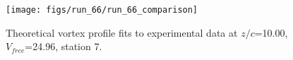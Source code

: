 \begin{figure}[H]
\centering
\texttt{[image: figs/run\_66/run\_66\_comparison]}
\caption{Theoretical vortex profile fits to experimental data at $z/c$=10.00, $V_{free}$=24.96, station 7.}
\label{fig:run_66_comparison}
\end{figure}


